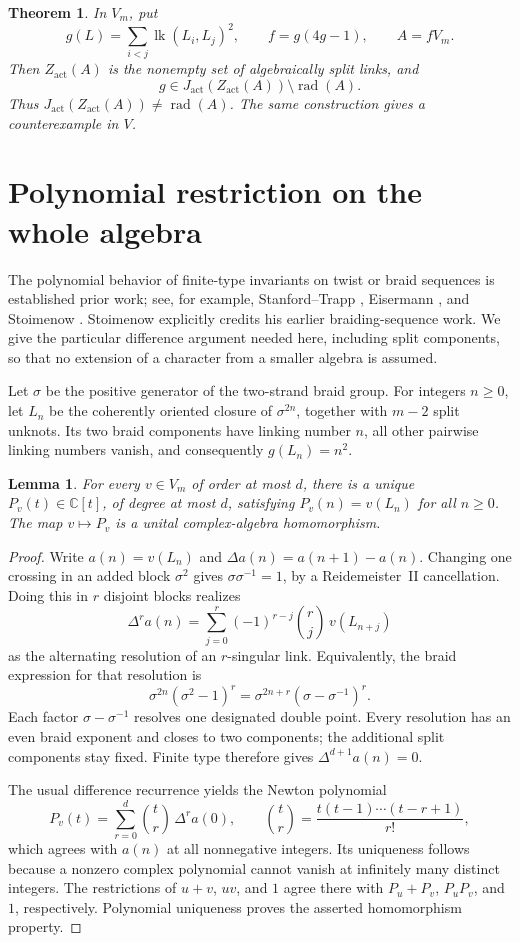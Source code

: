 \documentclass[11pt]{article}
\newtheorem{theorem}{Theorem}
\newtheorem{lemma}{Lemma}
\newcommand{\lk}{\operatorname{lk}}
\newcommand{\rad}{\operatorname{rad}}
\newcommand{\Zact}{Z_{\mathrm{act}}}
\newcommand{\Jact}{J_{\mathrm{act}}}
\begin{document}
\begin{theorem}\label{thm:main}
In \(V_m\), put
\[
 g(L)=\sum_{i<j}\lk(L_i,L_j)^2,\qquad f=g(4g-1),\qquad A=fV_m.
\]
Then \(\Zact(A)\) is the nonempty set of algebraically split links, and
\[
 g\in\Jact(\Zact(A))\setminus\rad(A).
\]
Thus \(\Jact(\Zact(A))\ne\rad(A)\). The same construction gives a
counterexample in \(V\).
\end{theorem}

\section{Polynomial restriction on the whole algebra}
The polynomial behavior of finite-type invariants on twist or braid
sequences is established prior work; see, for example,
Stanford--Trapp \cite[Theorem~E]{StanfordTrapp}, Eisermann \cite{Eisermann},
and Stoimenow \cite[Theorem~2.1, pp.~690--691]{Stoimenow}.
Stoimenow explicitly credits his earlier braiding-sequence work.
We give the particular difference argument needed here, including split
components, so that no extension of a character from a smaller algebra is
assumed.

Let \(\sigma\) be the positive generator of the two-strand braid group.
For integers \(n\geq0\), let \(L_n\) be the coherently oriented closure of
\(\sigma^{2n}\), together with \(m-2\) split unknots. Its two braid
components have linking number \(n\), all other pairwise linking numbers
vanish, and consequently \(g(L_n)=n^2\).

\begin{lemma}\label{lem:restriction}
For every \(v\in V_m\) of order at most \(d\), there is a unique
\(P_v(t)\in\mathbb C[t]\), of degree at most \(d\), satisfying
\(P_v(n)=v(L_n)\) for all \(n\geq0\).
The map \(v\mapsto P_v\) is a unital complex-algebra homomorphism.
\end{lemma}
\begin{proof}
Write \(a(n)=v(L_n)\) and \(\Delta a(n)=a(n+1)-a(n)\).
Changing one crossing in an added block \(\sigma^2\) gives
\(\sigma\sigma^{-1}=1\), by a Reidemeister~II cancellation.
Doing this in \(r\) disjoint blocks realizes
\[
 \Delta^r a(n)=\sum_{j=0}^r(-1)^{r-j}\binom rj\,v(L_{n+j})
\]
as the alternating resolution of an \(r\)-singular link. Equivalently,
the braid expression for that resolution is
\[
 \sigma^{2n}(\sigma^2-1)^r
   =\sigma^{2n+r}(\sigma-\sigma^{-1})^r.
\]
Each factor \(\sigma-\sigma^{-1}\) resolves one designated double point.
Every resolution has an even braid exponent and closes to two components;
the additional split components stay fixed.
Finite type therefore gives \(\Delta^{d+1}a(n)=0\).

The usual difference recurrence yields the Newton polynomial
\[
 P_v(t)=\sum_{r=0}^d \binom tr\,\Delta^r a(0),
 \qquad
 \binom tr=\frac{t(t-1)\cdots(t-r+1)}{r!},
\]
which agrees with \(a(n)\) at all nonnegative integers. Its uniqueness
follows because a nonzero complex polynomial cannot vanish at infinitely
many distinct integers.
The restrictions of \(u+v\), \(uv\), and \(1\) agree there with
\(P_u+P_v\), \(P_uP_v\), and \(1\), respectively. Polynomial uniqueness
proves the asserted homomorphism property.
\end{proof}
\end{document}
